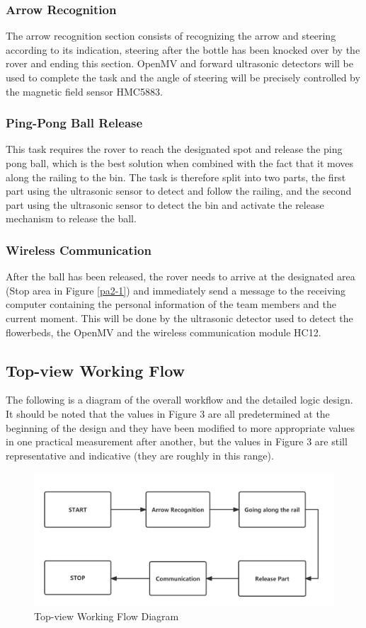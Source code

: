 \documentclass[12pt, a4paper, oneside]{report}
\begin{document}
\subsubsection{Arrow Recognition}
The arrow recognition section consists of recognizing the arrow and steering according to its indication, steering after the bottle has been knocked over by the rover and ending this section. OpenMV and forward ultrasonic detectors will be used to complete the task and the angle of steering will be precisely controlled by the magnetic field sensor HMC5883.

\newpage
\subsubsection{Ping-Pong Ball Release}
This task requires the rover to reach the designated spot and release the ping pong ball, which is the best solution when combined with the fact that it moves along the railing to the bin. The task is therefore split into two parts, the first part using the ultrasonic sensor to detect and follow the railing, and the second part using the ultrasonic sensor to detect the bin and activate the release mechanism to release the ball.

\subsubsection{Wireless Communication}
After the ball has been released, the rover needs to arrive at the designated area (Stop area in Figure \ref{pa2-1}) and immediately send a message to the receiving computer containing the personal information of the team members and the current moment. This will be done by the ultrasonic detector used to detect the flowerbeds, the OpenMV and the wireless communication module HC12.

\subsection{Top-view Working Flow}
The following is a diagram of the overall workflow and the detailed logic design. It should be noted that the values in Figure 3 are all predetermined at the beginning of the design and they have been modified to more appropriate values in one practical measurement after another, but the values in Figure 3 are still representative and indicative (they are roughly in this range).
\begin{figure}[H]
    \centering
    \includegraphics[scale=0.2]{pic/Patio 2/Arrow.png}
    \caption{Top-view Working Flow Diagram}
    \label{pa2-2}
\end{figure}
\end{document}
